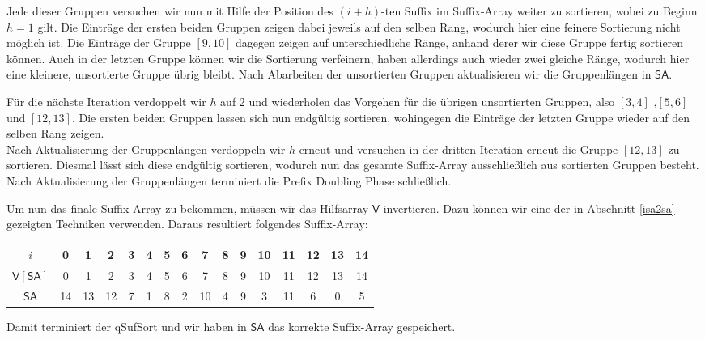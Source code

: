 Jede dieser Gruppen versuchen wir nun mit Hilfe der Position des $(i+h)$-ten Suffix im Suffix-Array weiter zu sortieren, wobei zu Beginn $h=1$ gilt. 
Die Einträge der ersten beiden Gruppen zeigen dabei jeweils auf den selben Rang, wodurch hier eine feinere Sortierung nicht möglich ist. Die Einträge der Gruppe $[9,10]$ dagegen zeigen auf unterschiedliche Ränge, anhand derer wir diese Gruppe fertig sortieren können. Auch in der letzten Gruppe können wir die Sortierung verfeinern, haben allerdings auch wieder zwei gleiche Ränge, wodurch hier eine kleinere, unsortierte Gruppe übrig bleibt. Nach Abarbeiten der unsortierten Gruppen aktualisieren wir die Gruppenlängen in $\mathsf{SA}$.

Für die nächste Iteration verdoppelt wir $h$ auf 2 und wiederholen das Vorgehen für die übrigen unsortierten Gruppen, also $[3,4]$ ,$[5,6]$ und $[12,13]$. Die ersten beiden Gruppen lassen sich nun endgültig sortieren, wohingegen die Einträge der letzten Gruppe wieder auf den selben Rang zeigen.\\
Nach Aktualisierung der Gruppenlängen verdoppeln wir $h$ erneut und versuchen in der dritten Iteration erneut die Gruppe $[12,13]$ zu sortieren. Diesmal lässt sich diese endgültig sortieren, wodurch nun das gesamte Suffix-Array ausschließlich aus sortierten Gruppen besteht. Nach Aktualisierung der Gruppenlängen terminiert die Prefix Doubling Phase schließlich.

Um nun das finale Suffix-Array zu bekommen, müssen wir das Hilfsarray $\mathsf{V}$ invertieren. Dazu können wir eine der in Abschnitt \ref{isa2sa} gezeigten Techniken verwenden. Daraus resultiert folgendes Suffix-Array:

\begin{center}
\begin{tabular}{| c | c | c | c | c | c | c | c | c | c | c | c | c | c | c | c |}
\hline
$i$ & 0 & 1 &2 &3 &4 &5 &6 &7 &8 &9 &10 &11 &12 &13 &14 \\
\hline
$\mathsf{V}[\mathsf{SA}]$ & 0 & 1 & 2 &  3 & 4 & 5 & 6 & 7 & 8 & 9 & 10 & 11 & 12 & 13 & 14 \\
$\mathsf{SA}$ & 14 & 13 & 12 & 7 & 1 & 8 & 2 & 10 & 4 & 9 & 3 & 11 & 6 & 0 & 5 \\
\hline
\end{tabular}
\end{center}

Damit terminiert der qSufSort und wir haben in $\mathsf{SA}$ das korrekte Suffix-Array gespeichert.
